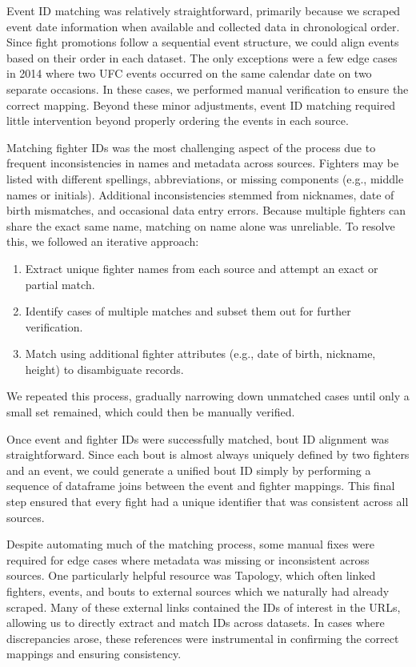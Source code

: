 \documentclass[12pt,twoside]{report}
\begin{document}
Event ID matching was relatively straightforward, primarily because we scraped event date information when available and collected data in chronological order. Since fight promotions follow a sequential event structure, we could align events based on their order in each dataset. The only exceptions were a few edge cases in 2014 where two UFC events occurred on the same calendar date on two separate occasions. In these cases, we performed manual verification to ensure the correct mapping. Beyond these minor adjustments, event ID matching required little intervention beyond properly ordering the events in each source.

Matching fighter IDs was the most challenging aspect of the process due to frequent inconsistencies in names and metadata across sources. Fighters may be listed with different spellings, abbreviations, or missing components (e.g., middle names or initials). Additional inconsistencies stemmed from nicknames, date of birth mismatches, and occasional data entry errors. Because multiple fighters can share the exact same name, matching on name alone was unreliable. To resolve this, we followed an iterative approach:
\begin{enumerate}
    \item Extract unique fighter names from each source and attempt an exact or partial match.

    \item Identify cases of multiple matches and subset them out for further verification.

    \item Match using additional fighter attributes (e.g., date of birth, nickname, height) to disambiguate records.
\end{enumerate}
We repeated this process, gradually narrowing down unmatched cases until only a small set remained, which could then be manually verified.

Once event and fighter IDs were successfully matched, bout ID alignment was straightforward. Since each bout is almost always uniquely defined by two fighters and an event, we could generate a unified bout ID simply by performing a sequence of dataframe joins between the event and fighter mappings. This final step ensured that every fight had a unique identifier that was consistent across all sources.

Despite automating much of the matching process, some manual fixes were required for edge cases where metadata was missing or inconsistent across sources. One particularly helpful resource was Tapology, which often linked fighters, events, and bouts to external sources which we naturally had already scraped. Many of these external links contained the IDs of interest in the URLs, allowing us to directly extract and match IDs across datasets. In cases where discrepancies arose, these references were instrumental in confirming the correct mappings and ensuring consistency.
\end{document}
